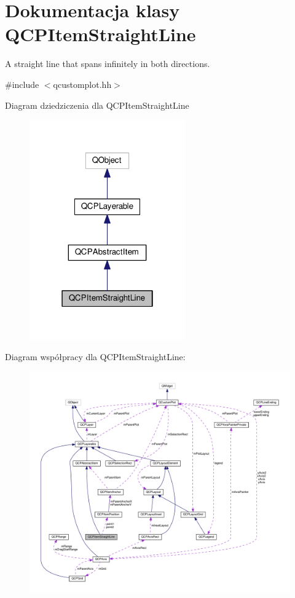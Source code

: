 \hypertarget{class_q_c_p_item_straight_line}{}\section{Dokumentacja klasy Q\+C\+P\+Item\+Straight\+Line}
\label{class_q_c_p_item_straight_line}


A straight line that spans infinitely in both directions.  




{\ttfamily \#include $<$qcustomplot.\+hh$>$}



Diagram dziedziczenia dla Q\+C\+P\+Item\+Straight\+Line\nopagebreak
\begin{figure}[H]
\begin{center}
\leavevmode
\includegraphics[width=190pt]{class_q_c_p_item_straight_line__inherit__graph}
\end{center}
\end{figure}


Diagram współpracy dla Q\+C\+P\+Item\+Straight\+Line\+:\nopagebreak
\begin{figure}[H]
\begin{center}
\leavevmode
\includegraphics[width=350pt]{class_q_c_p_item_straight_line__coll__graph}
\end{center}
\end{figure}
